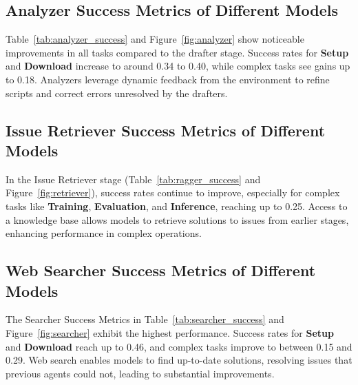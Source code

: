 \subsection*{Analyzer Success Metrics of Different Models}

Table~\ref{tab:analyzer_success} and Figure~\ref{fig:analyzer} show noticeable improvements in all tasks compared to the drafter stage. Success rates for \textbf{Setup} and \textbf{Download} increase to around 0.34 to 0.40, while complex tasks see gains up to 0.18. Analyzers leverage dynamic feedback from the environment to refine scripts and correct errors unresolved by the drafters.

\subsection*{Issue Retriever Success Metrics of Different Models}

In the Issue Retriever stage (Table~\ref{tab:ragger_success} and Figure~\ref{fig:retriever}), success rates continue to improve, especially for complex tasks like \textbf{Training}, \textbf{Evaluation}, and \textbf{Inference}, reaching up to 0.25. Access to a knowledge base allows models to retrieve solutions to issues from earlier stages, enhancing performance in complex operations.

\subsection*{Web Searcher Success Metrics of Different Models}

The Searcher Success Metrics in Table~\ref{tab:searcher_success} and Figure~\ref{fig:searcher} exhibit the highest performance. Success rates for \textbf{Setup} and \textbf{Download} reach up to 0.46, and complex tasks improve to between 0.15 and 0.29. Web search enables models to find up-to-date solutions, resolving issues that previous agents could not, leading to substantial improvements.

